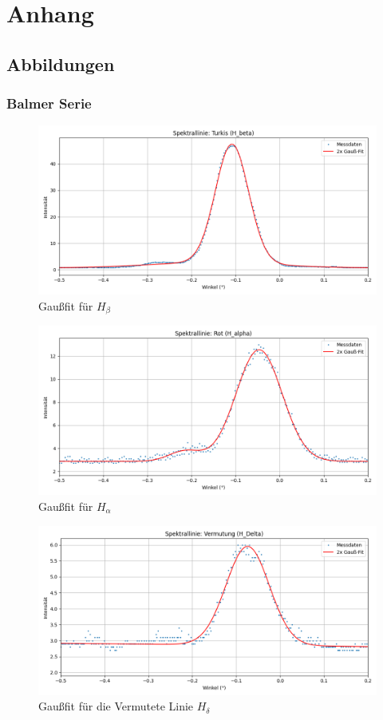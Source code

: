 \chapter{Anhang}
\section{Abbildungen}
\subsection*{Balmer Serie}

\begin{figure}[H]
\centering
\includegraphics[width=0.7\linewidth]{figs/dt_turkis_145_55_5.png}
\caption{Gaußfit für $H_\beta$}
\label{fig:H_b}
\end{figure}

\begin{figure}[H]
\centering
\includegraphics[width=0.7\linewidth]{figs/dt_rot_155_62.png}
\caption{Gaußfit für $H_\alpha$}
\label{fig:H_a}
\end{figure}

\begin{figure}[H]
\centering
\includegraphics[width=0.7\linewidth]{figs/dt_vermutung_145_49.png}
\caption{Gaußfit für die Vermutete Linie $H_\delta$}
\label{fig:H_d}
\end{figure}

